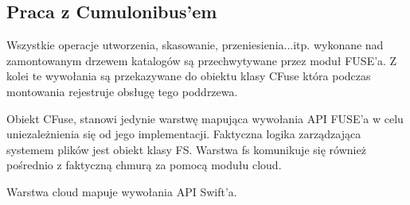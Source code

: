 \subsection{Praca z Cumulonibus'em}

Wszystkie operacje utworzenia, skasowanie, przeniesienia...itp. wykonane nad zamontowanym drzewem katalogów są przechwytywane przez moduł FUSE'a. Z kolei te wywołania są przekazywane do obiektu klasy CFuse która podczas montowania rejestruje obsługę tego poddrzewa.

Obiekt CFuse, stanowi jedynie warstwę mapująca wywołania API FUSE'a w celu uniezależnienia się od jego implementacji. Faktyczna logika zarządzająca systemem plików jest obiekt klasy FS. Warstwa fs komunikuje się również pośrednio z faktyczną chmurą za pomocą modułu cloud. 

Warstwa cloud mapuje wywołania API Swift'a. 



